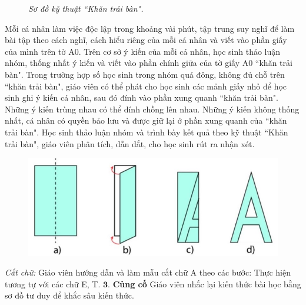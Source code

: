 \begin{multicols}{2}
\begin{figure}[H]
		\caption{\small\textit{\color{diendantoanhoc}Sơ đồ kỹ thuật ``Khăn trải bàn".}}
		\vspace*{-5pt}
	\end{figure}
	Mỗi cá nhân làm việc độc lập trong khoảng vài phút, tập trung suy nghĩ để làm bài tập theo cách nghĩ, cách hiểu riêng của mỗi cá nhân và viết vào phần giấy của mình trên tờ A$0$. Trên cơ sở ý kiến của mỗi cá nhân, học sinh thảo luận nhóm, thống nhất ý kiến và viết vào phần chính giữa của tờ giấy A$0$ ``khăn trải bàn".
	\vskip 0.1cm
	Trong trường hợp số học sinh trong nhóm quá đông, không đủ chỗ trên ``khăn trải bàn", giáo viên có thể phát cho học sinh các mảnh giấy nhỏ để học sinh ghi ý kiến cá nhân, sau đó đính vào phần xung quanh ``khăn trải bàn". Những ý kiến trùng nhau có thể đính chồng lên nhau. Những ý kiến không thống nhất, cá nhân có quyền bảo lưu và được giữ lại ở phần xung quanh của ``khăn trải bàn".
	\vskip 0.1cm
	Học sinh thảo luận nhóm và trình bày kết quả theo kỹ thuật ``Khăn trải bàn", giáo viên phân tích, dẫn dắt, cho học sinh rút ra nhận xét.  
		\begin{figure}[H]
		\vspace*{-5pt}
		\centering
		\captionsetup{labelformat= empty, justification=centering}
		\includegraphics[width= 1\linewidth]{6}
	\end{figure}
	\textit{Cắt chữ:} Giáo viên hướng dẫn và làm mẫu cắt chữ A theo các bước:
	\vskip 0.1cm
	Thực hiện tương tự với các chữ E, T. 
	\vskip 0.1cm
	$\pmb{3.}$ \textbf{\color{diendantoanhoc}Củng cố}
	\vskip 0.1cm
	Giáo viên  nhắc lại kiến thức bài học bằng sơ đồ tư duy để khắc sâu kiến thức.

\end{multicols}
